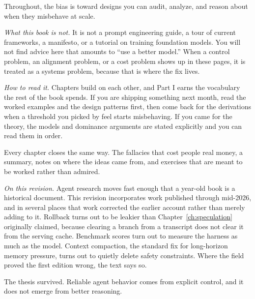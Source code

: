 Throughout, the bias is toward designs you can audit, analyze, and reason about
when they misbehave at scale.

\vspace{0.5em}
\noindent
\textit{What this book is not.}
It is not a prompt engineering guide, a tour of current frameworks, a
manifesto, or a tutorial on training foundation models. You will not find
advice here that amounts to ``use a better model.'' When a control problem,
an alignment problem, or a cost problem shows up in these pages, it is treated
as a systems problem, because that is where the fix lives.

\vspace{0.5em}
\noindent
\textit{How to read it.}
Chapters build on each other, and Part I earns the vocabulary the rest of the
book spends. If you are shipping something next month, read the worked examples
and the design patterns first, then come back for the derivations when a
threshold you picked by feel starts misbehaving. If you came for the theory,
the models and dominance arguments are stated explicitly and you can read them
in order.

Every chapter closes the same way. The fallacies that cost people real money,
a summary, notes on where the ideas came from, and exercises that are meant to
be worked rather than admired.

\vspace{0.5em}
\noindent
\textit{On this revision.}
Agent research moves fast enough that a year-old book is a historical document.
This revision incorporates work published through mid-2026, and in several
places that work corrected the earlier account rather than merely adding to it.
Rollback turns out to be leakier than Chapter~\ref{ch:speculation} originally
claimed, because clearing a branch from a transcript does not clear it from the
serving cache. Benchmark scores turn out to measure the harness as much as the
model. Context compaction, the standard fix for long-horizon memory pressure,
turns out to quietly delete safety constraints. Where the field proved the
first edition wrong, the text says so.

The thesis survived. Reliable agent behavior comes from explicit control, and
it does not emerge from better reasoning.

